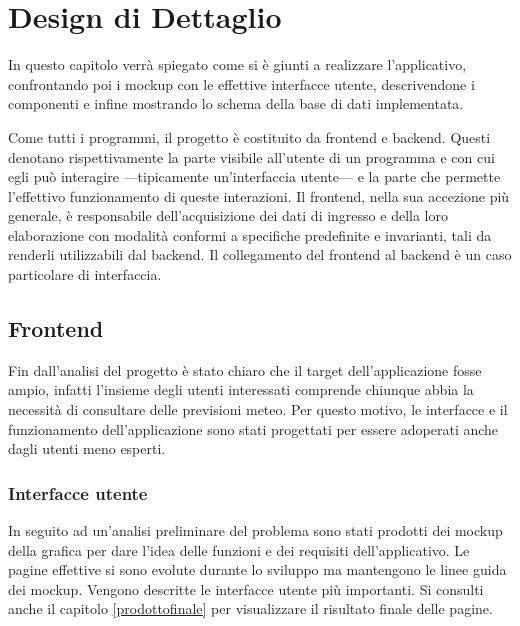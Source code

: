 \chapter{Design di Dettaglio}
In questo capitolo verrà spiegato come si è giunti a realizzare l’applicativo,
confrontando poi i mockup con le effettive interfacce utente, descrivendone i componenti e infine mostrando lo schema della base di dati implementata.

Come tutti i programmi, il progetto è costituito da  frontend e backend.
Questi denotano rispettivamente la parte visibile all'utente di un programma e con cui egli può interagire —tipicamente un'interfaccia utente— e la parte che permette l'effettivo funzionamento di queste interazioni. \newline
Il frontend, nella sua accezione più generale, è responsabile dell'acquisizione dei dati di ingresso e della loro elaborazione con modalità conformi a specifiche predefinite e invarianti, tali da renderli utilizzabili dal backend. Il collegamento del frontend al backend è un caso particolare di interfaccia.

\section{Frontend}
Fin dall'analisi del progetto è stato chiaro che il target dell'applicazione fosse ampio, infatti l'insieme degli utenti interessati comprende chiunque abbia la
necessità di consultare delle previsioni meteo.
Per questo motivo, le interfacce e il funzionamento dell'applicazione sono stati progettati per essere adoperati anche dagli utenti meno esperti.

\subsection{Interfacce utente}
In seguito ad un'analisi preliminare del problema sono stati prodotti dei mockup della grafica per dare l'idea delle funzioni e dei requisiti dell'applicativo. 
Le pagine effettive si sono evolute durante lo sviluppo ma mantengono le linee guida dei mockup. 
Vengono descritte le interfacce utente più importanti.
Si consulti anche il capitolo \ref{prodottofinale} per visualizzare il risultato finale delle pagine.

